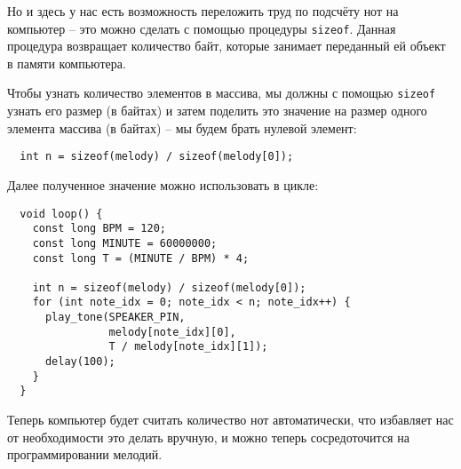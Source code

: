 \documentclass[../sparc.tex]{subfiles}
\begin{document}
Но и здесь у нас есть возможность переложить труд по подсчёту нот на компьютер --
это можно сделать с помощью процедуры \texttt{sizeof}.  Данная процедура
возвращает количество байт, которые занимает переданный ей объект в памяти
компьютера.

Чтобы узнать количество элементов в массива, мы должны с помощью \texttt{sizeof}
узнать его размер (в байтах) и затем поделить это значение на размер одного
элемента массива (в байтах) -- мы будем брать нулевой элемент:

\begin{verbatim}
  int n = sizeof(melody) / sizeof(melody[0]);
\end{verbatim}

Далее полученное значение можно использовать в цикле:

\begin{verbatim}
  void loop() {
    const long BPM = 120;
    const long MINUTE = 60000000;
    const long T = (MINUTE / BPM) * 4;

    int n = sizeof(melody) / sizeof(melody[0]);
    for (int note_idx = 0; note_idx < n; note_idx++) {
      play_tone(SPEAKER_PIN,
                melody[note_idx][0],
                T / melody[note_idx][1]);
      delay(100);
    }
  }
\end{verbatim}

Теперь компьютер будет считать количество нот автоматически, что избавляет нас
от необходимости это делать вручную, и можно теперь сосредоточится на
программировании мелодий.
\end{document}
